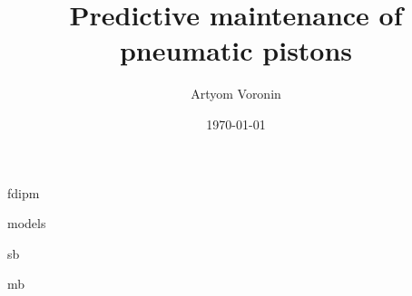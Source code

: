 \documentclass[11pt]{article}
\title{Predictive maintenance of pneumatic pistons}
\author{Artyom Voronin}
\date{\today}
\begin{document}
\maketitle	
\tableofcontents

{fdipm}
\pagebreak

{models}
\pagebreak

{sb}
\pagebreak

{mb}
\pagebreak
%
\end{document}
